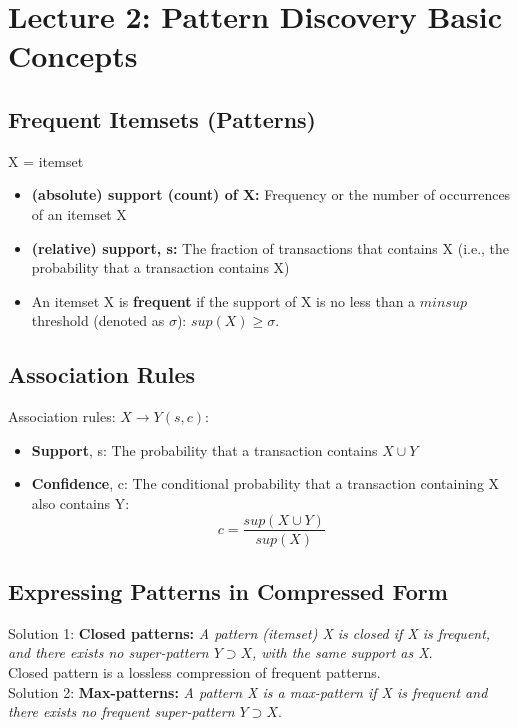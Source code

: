 \section{Lecture 2: Pattern Discovery Basic Concepts}
\subsection{Frequent Itemsets (Patterns)}

X = itemset

\begin{itemize}
\item \textbf{(absolute) support (count) of X:} Frequency or the number of occurrences of an itemset X
\item \textbf{(relative) support, s:} The fraction of transactions that contains X (i.e., the probability that a transaction contains X)
\item An itemset X is \textbf{frequent} if the support of X is no less than a $minsup$ threshold (denoted as $\sigma$): $sup(X) \geqslant \sigma$.
\end{itemize}

\subsection{Association Rules}
Association rules: $X \to Y (s, c)$:
\begin{itemize}
\item \textbf{Support}, s: The probability that a transaction contains $X \cup Y$
\item \textbf{Confidence}, c: The conditional probability that a transaction containing X also contains Y: 
\begin{equation*}
c = \frac{sup(X \cup Y)}{sup(X)}
\end{equation*}
\end{itemize}

\subsection{Expressing Patterns in Compressed Form}
Solution 1: \textbf{Closed patterns:} \textit{A pattern (itemset) X is closed if X is frequent, and there exists no super-pattern $Y \supset X$, with the same support as X}.\\
    
Closed pattern is a lossless compression of frequent patterns.\\

Solution 2: \textbf{Max-patterns:} \textit{A pattern X is a max-pattern if X is frequent and there exists no frequent super-pattern $Y \supset X$}.\\

